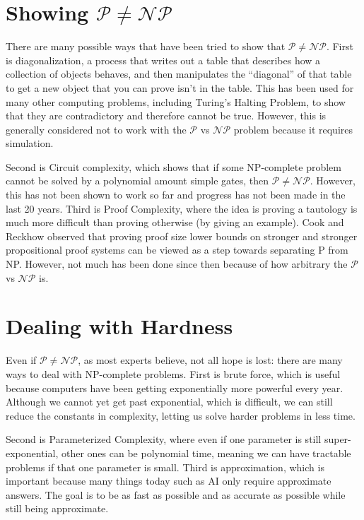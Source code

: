 \documentclass[11pt]{article}
\begin{document}
\section{Showing $\mathcal{P} \neq \mathcal{NP}$}
There are many possible ways that have been tried to show that $\mathcal{P} \neq \mathcal{NP}$. First is diagonalization, a process that writes out a table that describes how a collection of objects behaves, and then  manipulates the “diagonal” of that table to get a new object that you can prove isn’t in the table. This has been used for many other computing problems, including Turing's Halting Problem, to show that they are contradictory and therefore cannot be true. However, this is generally considered not to work with the $\mathcal{P}$ vs $\mathcal{NP}$ problem because it requires simulation. 

Second is Circuit complexity, which shows that if some NP-complete problem cannot be solved by a polynomial amount simple gates, then $\mathcal{P} \neq \mathcal{NP}$. However, this has not been shown to work so far and progress has not been made in the last 20 years. Third is Proof Complexity, where the idea is proving a tautology is much more difficult than proving otherwise (by giving an example). Cook and Reckhow observed that proving proof size lower bounds on stronger and stronger propositional proof systems can be viewed as a step towards separating P from NP. However, not much has been done since then because of how arbitrary the $\mathcal{P} $ vs $ \mathcal{NP}$ is.
\section{Dealing with Hardness}
Even if $\mathcal{P} \neq \mathcal{NP}$, as most experts believe, not all hope is lost: there are many ways to deal with NP-complete problems. First is brute force, which is useful because computers have been getting exponentially more powerful every year. Although we cannot yet get past exponential, which is difficult, we can still reduce the constants in complexity, letting us solve harder problems in less time. 

Second is Parameterized Complexity, where even if one parameter is still super-exponential, other ones can be polynomial time, meaning we can have tractable problems if that one parameter is small.
Third is approximation, which is important because many things today such as AI only require approximate answers. The goal is to be as fast as possible and as accurate as possible while still being approximate. 
\end{document}
